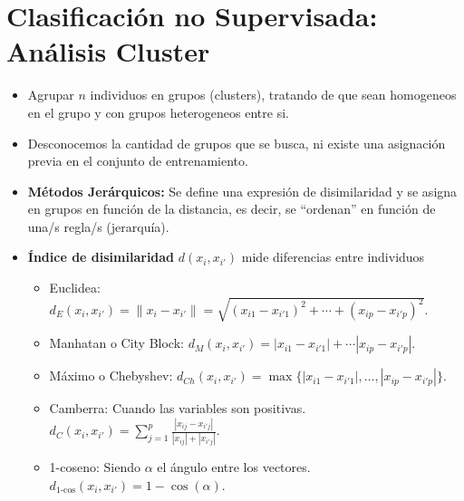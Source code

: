\section{Clasificación no Supervisada: Análisis Cluster}

\begin{itemize}
    \item Agrupar $n$ individuos en grupos (clusters), tratando de que sean homogeneos en el grupo y con grupos heterogeneos entre si.
    \item Desconocemos la cantidad de grupos que se busca, ni existe una asignación previa en el conjunto de entrenamiento.
    \item \textbf{Métodos Jerárquicos:} Se define una expresión de disimilaridad y se asigna en grupos en función de la distancia, es decir, se ``ordenan'' en función de una/s regla/s (jerarquía).
    \item \textbf{Índice de disimilaridad} $d(x_i,x_{i'})$ mide diferencias entre individuos
    \begin{itemize}
        \item Euclidea: $d_E(x_i,x_{i'})=\|x_i-x_{i'}\|=\sqrt{(x_{i1}-x_{i'1})^2+\cdots+(x_{ip}-x_{i'p})^2}$.
        \item Manhatan o City Block: $d_M(x_i,x_{i'})=|x_{i1}-x_{i'1}|+\cdots|x_{ip}-x_{i'p}|$.
        \item Máximo o Chebyshev: $d_{Ch}(x_i,x_{i'})=\max\{|x_{i1}-x_{i'1}|,\dots,|x_{ip}-x_{i'p}|\}$.
        \item Camberra: Cuando las variables son positivas. $d_C(x_i,x_{i'})=\sum_{j=1}^p\frac{|x_{ij}-x_{i'j}|}{|x_{ij}|+|x_{i'j}|}$.
        \item 1-coseno: Siendo $\alpha$ el ángulo entre los vectores. $d_{\text{1-cos}}(x_i,x_{i'})=1-\cos(\alpha)$.
        

\end{itemize}
\end{itemize}
